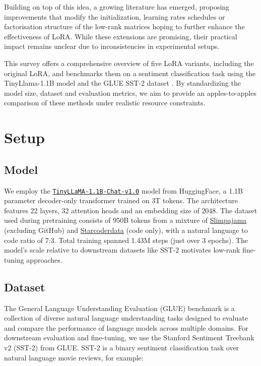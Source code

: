 \documentclass[a4paper,10pt,twocolumn,english]{article}
\begin{document}
Building on top of this idea, a growing literature has emerged, proposing improvements that modify the initialization, learning rates schedules or factorisation structure of the low-rank matrices hoping to further enhance the effectiveness of LoRA. While these extensions are promising, their practical impact remains unclear due to inconsistencies in experimental setups.

This survey offers a comprehensive overview of five LoRA variants, including the original LoRA, and benchmarks them on a sentiment classification task using the TinyLlama-1.1B model \cite{zhang2024tinyllamaopensourcesmalllanguage} and the GLUE SST-2 dataset \cite{wang2019gluemultitaskbenchmarkanalysis}. By standardizing the model size, dataset and evaluation metrics, we aim to provide an apples-to-apples comparison of these methods under realistic resource constraints.

\section{Setup}

\subsection{Model}

We employ the \href{https://huggingface.co/TinyLlama/TinyLlama-1.1B-Chat-v1.0}{\texttt{TinyLLaMA-1.1B-Chat-v1.0}} model from HuggingFace, a 1.1B parameter decoder-only transformer trained on 3T tokens. The architecture features 22 layers, 32 attention heads and an embedding size of 2048. The dataset used during pretraining consists of 950B tokens from a mixture of \href{https://huggingface.co/datasets/cerebras/SlimPajama-627B}{Slimpajama} (excluding GitHub) and \href{https://huggingface.co/datasets/bigcode/starcoderdata}{Starcoderdata} (code only), with a natural language to code ratio of 7:3. Total training spanned 1.43M steps (just over 3 epochs). The model's scale relative to downstream datasets like SST-2 motivates low-rank fine-tuning approaches.

\subsection{Dataset}

The General Language Understanding Evaluation (GLUE) benchmark is a collection of diverse natural language understanding tasks designed to evaluate and compare the performance of language models across multiple domains. For downstream evaluation and fine-tuning, we use the Stanford Sentiment Treebank v2 (SST-2) from GLUE. SST-2 is a binary sentiment classification task over natural language movie reviews, for example:
\end{document}
